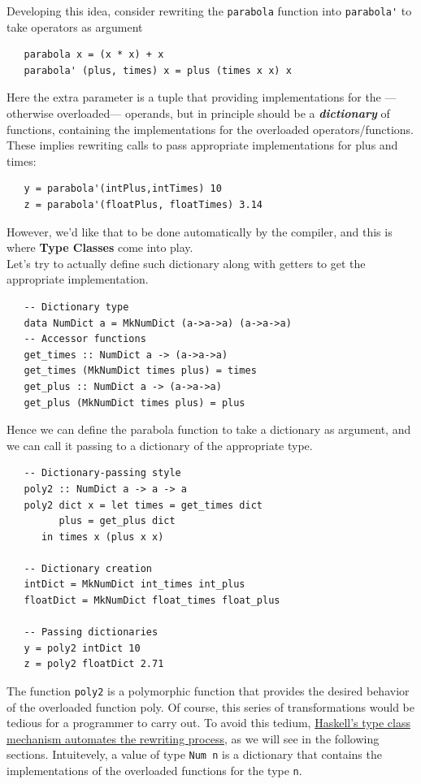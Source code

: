 Developing this idea, consider rewriting the \lstinline|parabola| function into \lstinline|parabola'| to take operators as argument
\begin{lstlisting}
   parabola x = (x * x) + x
   parabola' (plus, times) x = plus (times x x) x
\end{lstlisting}
Here the extra parameter is a tuple that providing implementations for the ---otherwise overloaded--- operands, but in principle should be a \textit{\textbf{dictionary}} of functions, containing the implementations for the overloaded operators/functions.
These implies rewriting calls to pass appropriate implementations for plus and times:
\begin{lstlisting}
   y = parabola'(intPlus,intTimes) 10
   z = parabola'(floatPlus, floatTimes) 3.14
\end{lstlisting}
However, we'd like that to be done automatically by the compiler, and this is where \textbf{Type Classes} come into play.\\
Let's try to actually define such dictionary along with getters to get the appropriate implementation.
\begin{lstlisting}
   -- Dictionary type
   data NumDict a = MkNumDict (a->a->a) (a->a->a)
   -- Accessor functions
   get_times :: NumDict a -> (a->a->a)
   get_times (MkNumDict times plus) = times
   get_plus :: NumDict a -> (a->a->a)
   get_plus (MkNumDict times plus) = plus
\end{lstlisting}

Hence we can define the parabola function to take a dictionary as argument, and we can call it passing to a dictionary of the appropriate type.
\begin{lstlisting}
   -- Dictionary-passing style
   poly2 :: NumDict a -> a -> a
   poly2 dict x = let times = get_times dict
         plus = get_plus dict
      in times x (plus x x)

   -- Dictionary creation
   intDict = MkNumDict int_times int_plus
   floatDict = MkNumDict float_times float_plus

   -- Passing dictionaries
   y = poly2 intDict 10
   z = poly2 floatDict 2.71
\end{lstlisting}
The function \lstinline|poly2| is a polymorphic function that provides the desired behavior
of the overloaded function poly.
Of course, this series of transformations would be tedious for a programmer
to carry out. To avoid this tedium, \ul{Haskell's type class mechanism automates the
rewriting process}, as we will see in the following sections.
Intuitevely, a value of type \lstinline|Num n| is a dictionary that contains the implementations of the overloaded functions for the type \lstinline|n|.


